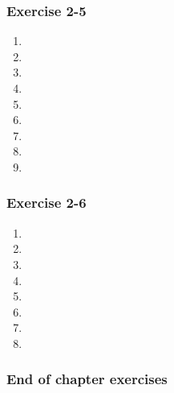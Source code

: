 {\begin{multicols}{3}
\subsubsection*{Exercise 2-5} %
\begin{enumerate}[noitemsep, label=\textbf{\arabic*}. ] 
\item %
\item %
\item %
\item %
\item %
\item %
\item %
\item %
\item %
\end{enumerate}

\subsubsection*{Exercise 2-6} %

\begin{enumerate}[noitemsep, label=\textbf{\arabic*}. ] 
    \item %
    \item %
    \item %
    \item %
    \item %
    \item %
    \item %
\item %
    \end{enumerate}
% 
\subsubsection*{End of chapter exercises} %


\end{multicols}}
